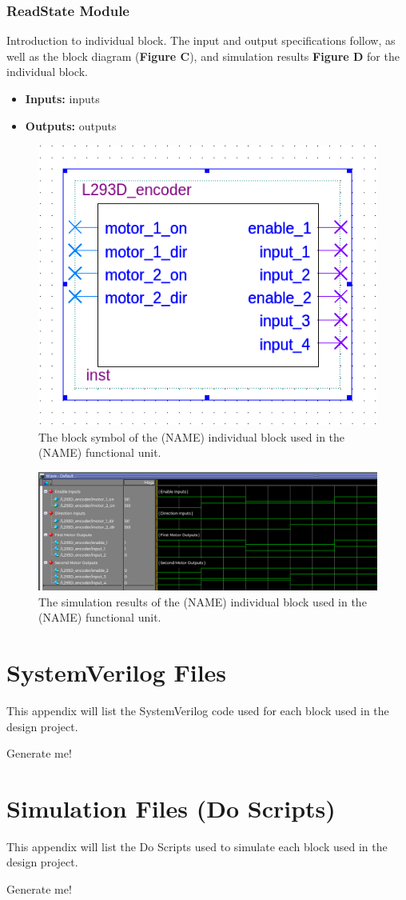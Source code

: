 \documentclass[a4paper]{article}
\begin{document}
\clearpage



\subsubsection{ReadState Module}
Introduction to individual block. The input and output specifications follow, as well as the block diagram (\textbf{Figure C}), and simulation results \textbf{Figure D} for the individual block.
\begin{itemize}
  \item \textbf{Inputs:  } inputs
  \item \textbf{Outputs: } outputs
\end{itemize}
\begin{figure}[h]
  \centering
  \includegraphics[width=.48\textwidth]{symbols/individual_placeholder.png}
  \caption{The block symbol of the (NAME) individual block used in the (NAME) functional unit.}
    \label{fig:individual-1-2-block}
\end{figure}
\begin{figure}[h]
  \centering
  \includegraphics[width=.98\textwidth]{sims/placeholder_sim.png}
  \caption{The simulation results of the (NAME) individual block used in the (NAME) functional unit.}
    \label{fig:individual-1-2-sim}
\end{figure}




\clearpage



\appendix
\section{SystemVerilog Files}
This appendix will list the SystemVerilog code used for each block used in the design project.

Generate me!

\clearpage




\section{Simulation Files (Do Scripts)}
This appendix will list the Do Scripts used to simulate each block used in the design project.

Generate me!
\end{document}
